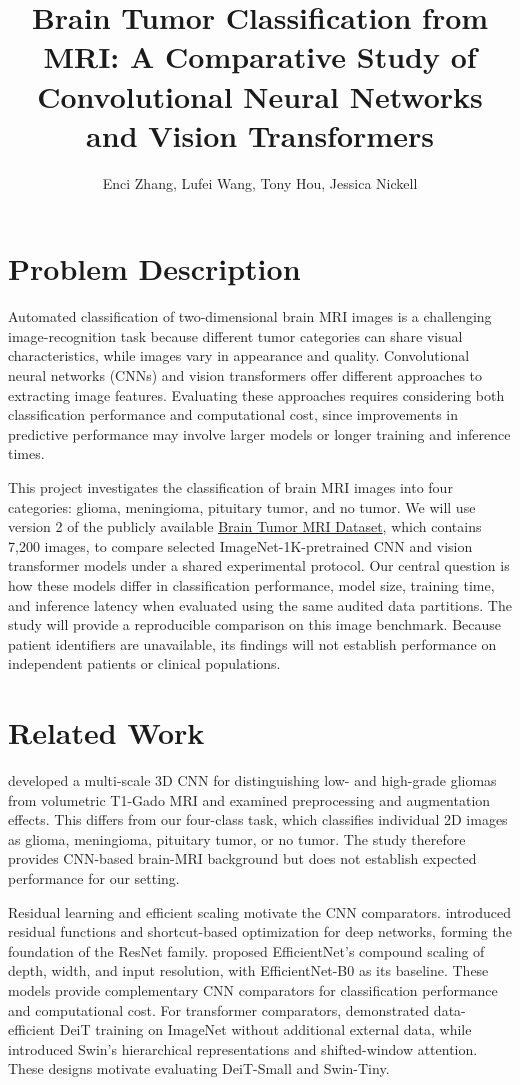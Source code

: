 \documentclass{article}
\title{Brain Tumor Classification from MRI: A Comparative Study of Convolutional Neural Networks and Vision Transformers}
\author{Enci Zhang, Lufei Wang, Tony Hou, Jessica Nickell}
\date{} %
\begin{document}
\maketitle
\section*{Problem Description}
Automated classification of two-dimensional brain MRI images is a challenging image-recognition task because different tumor categories can share visual
characteristics, while images vary in appearance and quality. Convolutional neural networks (CNNs) and vision transformers offer different approaches to
extracting image features. Evaluating these approaches requires considering both classification performance and computational cost, since improvements
in predictive performance may involve larger models or longer training and inference times.

This project investigates the classification of brain MRI images into four categories: glioma, meningioma, pituitary tumor, and no tumor. We will use
version 2 of the publicly available \href{https://www.kaggle.com/datasets/masoudnickparvar/brain-tumor-mri-dataset}{Brain Tumor MRI Dataset}, which contains 
7,200 images, to compare selected ImageNet-1K-pretrained CNN and vision transformer models under a shared experimental protocol. Our central question is how these 
models differ in classification performance, model size, training time, and inference latency when evaluated using the same audited data partitions. The study will
provide a reproducible comparison on this image benchmark. Because patient identifiers are unavailable, its findings will not establish performance on
independent patients or clinical populations.

\section*{Related Work}
\citet{mzoughi2020} developed a multi-scale 3D CNN for distinguishing low- and high-grade gliomas from volumetric T1-Gado MRI and examined preprocessing and 
augmentation effects. This differs from our four-class task, which classifies individual 2D images as glioma, meningioma, pituitary tumor, or no tumor. The study 
therefore provides CNN-based brain-MRI background but does not establish expected performance for our setting.

Residual learning and efficient scaling motivate the CNN comparators. \citet{he2016} introduced residual functions and shortcut-based optimization for deep 
networks, forming the foundation of the ResNet family. \citet{tan2019} proposed EfficientNet's compound scaling of depth, width, and input resolution, with 
EfficientNet-B0 as its baseline. These models provide complementary CNN comparators for classification performance and computational cost. For transformer 
comparators, \citet{touvron2021} demonstrated data-efficient DeiT training on ImageNet without additional external data, while \citet{liu2021} introduced Swin's 
hierarchical representations and shifted-window attention. These designs motivate evaluating DeiT-Small and Swin-Tiny.
\end{document}
